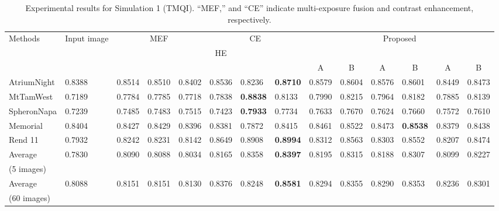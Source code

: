 \documentclass[paper]{ieice}
\begin{document}
\begin{table*}[!t]
  \centering
  \caption{Experimental results for Simulation 1 (TMQI).
  ``MEF,'' and ``CE'' indicate
  multi-exposure fusion and contrast enhancement, respectively.}
  {\footnotesize
  \begin{tabular}{l|l|lll|lll|ll|ll|ll} \hline \hline
    \multirow{3}{*}{Methods} & \multirow{3}{10mm}{Input image} & \multicolumn{3}{c|}{MEF} &
    \multicolumn{3}{c|}{CE} & \multicolumn{6}{c}{Proposed}\\\cline{3-14}
    & & \multicolumn{1}{c}{\cite{mertens2009exposure}} &
    \multicolumn{1}{c}{\cite{sakai2015hybrid}} & \multicolumn{1}{c|}{\cite{nejati2017fast}} &
    \multicolumn{1}{c}{HE} & \multicolumn{1}{c}{\cite{zuiderveld1994contrast}} &
    \multicolumn{1}{c|}{\cite{wu2017contrast}} &
    \multicolumn{2}{c|}{\cite{mertens2009exposure}} &
    \multicolumn{2}{c|}{\cite{sakai2015hybrid}} &
    \multicolumn{2}{c}{\cite{nejati2017fast}}\\
    &&&&&&&& \multicolumn{1}{c}{A} & \multicolumn{1}{c|}{B} &
    \multicolumn{1}{c}{A} & \multicolumn{1}{c|}{B} & \multicolumn{1}{c}{A} &
    \multicolumn{1}{c}{B}\\
    \hdashline
AtriumNight & 0.8388 & 0.8514 & 0.8510 & 0.8402 & 0.8536 & 0.8236 & \textbf{0.8710} & 0.8579 & 0.8604 & 0.8576 & 0.8601 & 0.8449 & 0.8473 \\
MtTamWest & 0.7189 & 0.7784 & 0.7785 & 0.7718 & 0.7838 & \textbf{0.8838} & 0.8133 & 0.7990 & 0.8215 & 0.7964 & 0.8182 & 0.7885 & 0.8139 \\
SpheronNapa & 0.7239 & 0.7485 & 0.7483 & 0.7515 & 0.7423 & \textbf{0.7933} & 0.7734 & 0.7633 & 0.7670 & 0.7624 & 0.7660 & 0.7572 & 0.7610 \\
Memorial & 0.8404 & 0.8427 & 0.8429 & 0.8396 & 0.8381 & 0.7872 & 0.8415 & 0.8461 & 0.8522 & 0.8473 & \textbf{0.8538} & 0.8379 & 0.8438 \\
Rend 11 & 0.7932 & 0.8242 & 0.8231 & 0.8142 & 0.8649 & 0.8908 & \textbf{0.8994} & 0.8312 & 0.8563 & 0.8303 & 0.8552 & 0.8207 & 0.8474 \\\hdashline
Average & \multirow{2}{*}{0.7830} & \multirow{2}{*}{0.8090} & \multirow{2}{*}{0.8088} & \multirow{2}{*}{0.8034} & \multirow{2}{*}{0.8165} & \multirow{2}{*}{0.8358} & \multirow{2}{*}{\textbf{0.8397}} & \multirow{2}{*}{0.8195} & \multirow{2}{*}{0.8315} & \multirow{2}{*}{0.8188} & \multirow{2}{*}{0.8307} & \multirow{2}{*}{0.8099} & \multirow{2}{*}{0.8227} \\
(5 images) &  &  &  &  &  &  &  &  &  &  &  &  &  \\\hdashline
Average & \multirow{2}{*}{0.8088} & \multirow{2}{*}{0.8151} & \multirow{2}{*}{0.8151} & \multirow{2}{*}{0.8130} & \multirow{2}{*}{0.8376} & \multirow{2}{*}{0.8248} & \multirow{2}{*}{\textbf{0.8581}} & \multirow{2}{*}{0.8294} & \multirow{2}{*}{0.8355} & \multirow{2}{*}{0.8290} & \multirow{2}{*}{0.8353} & \multirow{2}{*}{0.8236} & \multirow{2}{*}{0.8301} \\
(60 images) &  &  &  &  &  &  &  &  &  &  &  &  & \\\hline
  \end{tabular}
  }
  \label{tab:HDRTMQI}
\end{table*}
\end{document}
